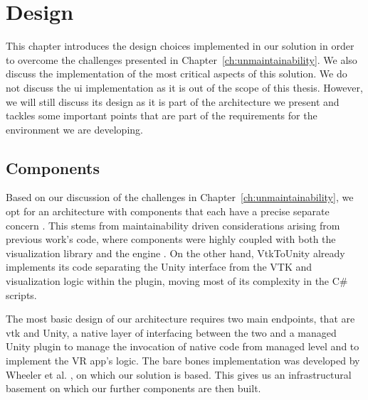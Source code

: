 \chapter{Design}
\label{ch:design}

This chapter introduces the design choices implemented in our solution in order to overcome the challenges presented in Chapter~\ref{ch:unmaintainability}. We also discuss the implementation of the most critical aspects of this solution. We do not discuss the \acrshort{ui} implementation as it is out of the scope of this thesis. However, we will still discuss its design as it is part of the architecture we present and tackles some important points that are part of the requirements for the environment we are developing.


\section{Components}
\label{sec:components}

Based on our discussion of the challenges in Chapter~\ref{ch:unmaintainability}, we opt for an architecture with components that each have a precise separate concern \cite{Hursch95separationof}. This stems from maintainability driven considerations arising from previous work's code, where components were highly coupled with both the visualization library and the engine \cite{dreuning_visual_2016, duking_potential_2018, kruis_creating_2017}. On the other hand, VtkToUnity already implements its code separating the Unity interface from the VTK and visualization logic within the plugin, moving most of its complexity in the C\# scripts.

The most basic design of our architecture requires two main endpoints, that are \acrshort{vtk} and Unity, a native layer of interfacing between the two and a managed Unity plugin to manage the invocation of native code from managed level and to implement the VR app's logic. The bare bones implementation was developed by Wheeler et al. \cite{wheeler_virtual_2018}, on which our solution is based. This gives us an infrastructural basement on which our further components are then built.

